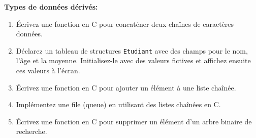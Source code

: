 \textbf{Types de données dérivés:}

\begin{enumerate}
	\item Écrivez une fonction en C pour concaténer deux chaînes de caractères données.
	\item Déclarez un tableau de structures \texttt{Etudiant} avec des champs pour le nom, l'âge et la moyenne. Initialisez-le avec des valeurs fictives et affichez ensuite ces valeurs à l'écran.
	\item Écrivez une fonction en C pour ajouter un élément à une liste chaînée.
	\item Implémentez une file (queue) en utilisant des listes chaînées en C.
	\item Écrivez une fonction en C pour supprimer un élément d'un arbre binaire de recherche.
\end{enumerate}

